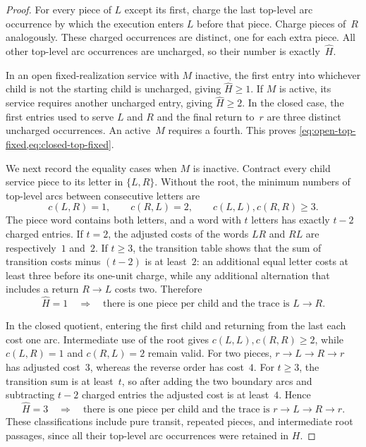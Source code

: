 \documentclass[12pt,a4paper,oneside]{report}
\begin{document}
\begin{proof}
For every piece of $L$ except its first, charge the last top-level arc
occurrence by which the execution enters $L$ before that piece.  Charge pieces
of~$R$ analogously.  These charged occurrences are distinct, one for each
extra piece.  All other top-level arc occurrences are uncharged, so their
number is exactly~$\widehat H$.

In an open fixed-realization service with $M$ inactive, the first entry into
whichever child is not the starting child is uncharged, giving
$\widehat H\ge1$.  If $M$ is active, its service requires another uncharged
entry, giving $\widehat H\ge2$.  In the closed case, the first entries used to
serve $L$ and $R$ and the final return to~$r$ are three distinct uncharged
occurrences.  An active~$M$ requires a fourth.  This proves
\cref{eq:open-top-fixed,eq:closed-top-fixed}.

We next record the equality cases when $M$ is inactive.  Contract every child
service piece to its letter in $\{L,R\}$.  Without the root, the minimum
numbers of top-level arcs between consecutive letters are
\[
    c(L,R)=1,\qquad c(R,L)=2,\qquad
    c(L,L),c(R,R)\ge3.
\]
The piece word contains both letters, and a word with $t$ letters has exactly
$t-2$ charged entries.  If $t=2$, the adjusted costs of the words $LR$ and
$RL$ are respectively~$1$ and~$2$.  If $t\ge3$, the transition table shows
that the sum of transition costs minus $(t-2)$ is at least~$2$: an additional
equal letter costs at least three before its one-unit charge, while any
additional alternation that includes a return $R\to L$ costs two.  Therefore
\begin{equation}\label{eq:open-equality-trace}
    \widehat H=1
    \quad\Longrightarrow\quad
    \text{there is one piece per child and the trace is }L\to R.
\end{equation}

In the closed quotient, entering the first child and returning from the last
each cost one arc.  Intermediate use of the root gives
$c(L,L),c(R,R)\ge2$, while $c(L,R)=1$ and $c(R,L)=2$ remain valid.  For two
pieces, $r\to L\to R\to r$ has adjusted cost~$3$, whereas the reverse order
has cost~$4$.  For $t\ge3$, the transition sum is at least~$t$, so after
adding the two boundary arcs and subtracting $t-2$ charged entries the adjusted
cost is at least~$4$.  Hence
\begin{equation}\label{eq:closed-equality-trace}
    \widehat H=3
    \quad\Longrightarrow\quad
    \text{there is one piece per child and the trace is }
    r\to L\to R\to r.
\end{equation}
These classifications include pure transit, repeated pieces, and intermediate
root passages, since all their top-level arc occurrences were retained in
$H$.


\end{proof}
\end{document}
